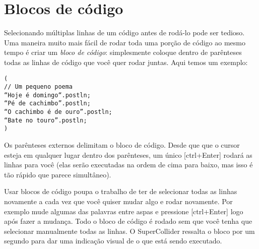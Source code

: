 \section{Blocos de código}
\label{sec:code-block}


Selecionando múltiplas linhas de um código antes de rodá-lo pode ser tedioso. Uma maneira muito mais fácil de rodar toda uma porção de código ao mesmo tempo é criar um \textit{bloco de código}: simplesmente coloque dentro de parênteses todas as linhas de código que você quer rodar juntas. Aqui temos um exemplo:


\begin{lstlisting}[style=SuperCollider-IDE, basicstyle=\scttfamily\footnotesize]
(
// Um pequeno poema
“Hoje é domingo“.postln;
“Pé de cachimbo”.postln;
“O cachimbo é de ouro”.postln;
“Bate no touro”.postln;
)
\end{lstlisting}

Os parênteses externos delimitam o bloco de código. Desde que que o cursor esteja em qualquer lugar dentro dos parênteses, um único [ctrl+Enter] rodará as linhas para você (elas serão executadas na ordem de cima para baixo, mas isso é tão rápido que parece simultâneo).

Usar blocos de código poupa o trabalho de ter de selecionar todas as linhas novamente a cada vez que você quiser mudar algo e rodar novamente. Por exemplo mude algumas das palavras entre aspas e pressione [ctrl+Enter] logo após fazer a mudança. Todo o bloco de código é rodado sem que você tenha que selecionar manualmente todas as linhas. O SuperCollider ressalta o bloco por um segundo para dar uma indicação visual de o que está sendo executado.
